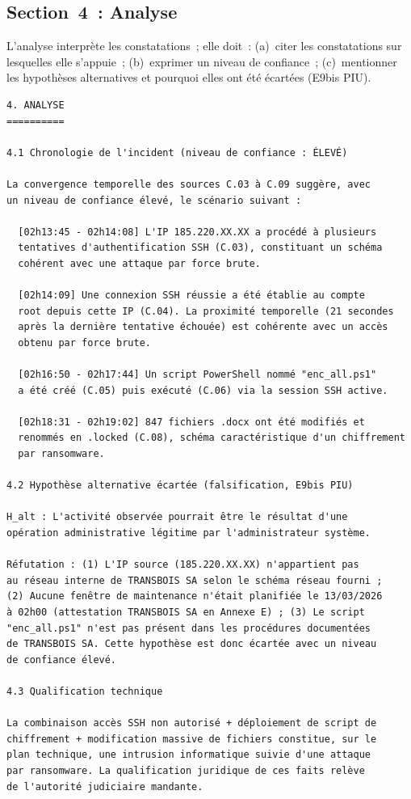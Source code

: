 \subsection{Section~4~: Analyse}

L'analyse interprète les constatations~; elle doit~:
(a)~citer les constatations sur lesquelles elle s'appuie~;
(b)~exprimer un niveau de confiance~;
(c)~mentionner les hypothèses alternatives et pourquoi elles ont été
écartées (E9bis PIU).

\begin{lstlisting}[language=bash_forensique,
    caption={Section Analyse --- exemple MVOM}]
4. ANALYSE
==========

4.1 Chronologie de l'incident (niveau de confiance : ÉLEVÉ)

La convergence temporelle des sources C.03 à C.09 suggère, avec
un niveau de confiance élevé, le scénario suivant :

  [02h13:45 - 02h14:08] L'IP 185.220.XX.XX a procédé à plusieurs
  tentatives d'authentification SSH (C.03), constituant un schéma
  cohérent avec une attaque par force brute.

  [02h14:09] Une connexion SSH réussie a été établie au compte
  root depuis cette IP (C.04). La proximité temporelle (21 secondes
  après la dernière tentative échouée) est cohérente avec un accès
  obtenu par force brute.

  [02h16:50 - 02h17:44] Un script PowerShell nommé "enc_all.ps1"
  a été créé (C.05) puis exécuté (C.06) via la session SSH active.

  [02h18:31 - 02h19:02] 847 fichiers .docx ont été modifiés et
  renommés en .locked (C.08), schéma caractéristique d'un chiffrement
  par ransomware.

4.2 Hypothèse alternative écartée (falsification, E9bis PIU)

H_alt : L'activité observée pourrait être le résultat d'une
opération administrative légitime par l'administrateur système.

Réfutation : (1) L'IP source (185.220.XX.XX) n'appartient pas
au réseau interne de TRANSBOIS SA selon le schéma réseau fourni ;
(2) Aucune fenêtre de maintenance n'était planifiée le 13/03/2026
à 02h00 (attestation TRANSBOIS SA en Annexe E) ; (3) Le script
"enc_all.ps1" n'est pas présent dans les procédures documentées
de TRANSBOIS SA. Cette hypothèse est donc écartée avec un niveau
de confiance élevé.

4.3 Qualification technique

La combinaison accès SSH non autorisé + déploiement de script de
chiffrement + modification massive de fichiers constitue, sur le
plan technique, une intrusion informatique suivie d'une attaque
par ransomware. La qualification juridique de ces faits relève
de l'autorité judiciaire mandante.
\end{lstlisting}

